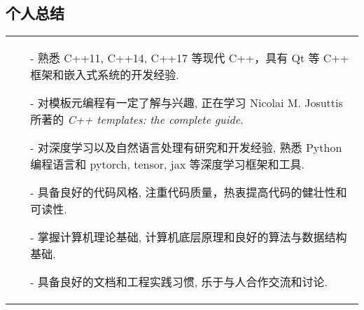 \documentclass[a4paper,12pt]{article}
\begin{document}
\begin{CJK*}{UTF8}{gbsn}
\section{个人总结}
\begin{tabularx}{\linewidth}{ X@{}  }
\begin{minipage}[t]{\linewidth}
    \begin{itemize}[nosep,after=\strut, leftmargin=1em, itemsep=3pt]
        \item[-] 熟悉 C++11, C++14, C++17 等现代 C++，具有 Qt 等 C++ 框架和嵌入式系统的开发经验.
        \item[-] 对模板元编程有一定了解与兴趣, 正在学习 Nicolai M. Josuttis 所著的 \textit{C++ templates: the complete guide}.
        \item[-] 对深度学习以及自然语言处理有研究和开发经验, 熟悉 Python 编程语言和 pytorch, tensor, jax 等深度学习框架和工具.
        \item[-] 具备良好的代码风格, 注重代码质量，热衷提高代码的健壮性和可读性.
        \item[-] 掌握计算机理论基础, 计算机底层原理和良好的算法与数据结构基础.
        \item[-] 具备良好的文档和工程实践习惯, 乐于与人合作交流和讨论.
    \end{itemize}
\end{minipage}\\
\end{tabularx}
\vfill
{}
\end{CJK*}
\end{document}
